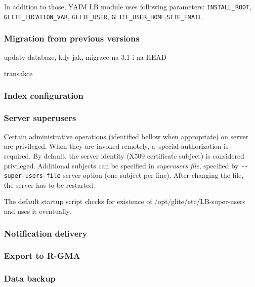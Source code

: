 In addition to those, YAIM LB module uses following parameters:
\texttt{INSTALL\_ROOT}, \texttt{GLITE\_LOCATION\_VAR}, \texttt{GLITE\_USER}, \texttt{GLITE\_USER\_HOME},\texttt{SITE\_EMAIL}.

\subsubsection{Migration from previous versions}


updaty databaze, kdy jak, migrace na 3.1 i na HEAD

transakce


\subsubsection{Index configuration}


\subsubsection{Server superusers}

Certain administrative operations (identified bellow when appropriate)
on \LB server are privileged.
When they are invoked remotely, a~special authorization is required.
By default, the server identity (X509 certificate subject) is considered
privileged.
Additional subjects can be specified in \emph{superusers file},
specified by \verb'--super-users-file' server option
(one subject per line).
After changing the file, the server has to be restarted.

The default startup script checks for existence of 
/opt/glite/etc/LB-super-users and uses it eventually.


\subsubsection{Notification delivery}

\subsubsection{Export to R-GMA}

\subsubsection{Data backup}
\label{inst:backup}

